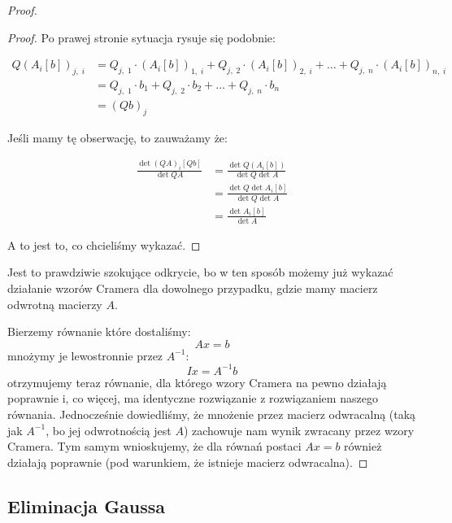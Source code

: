 \begin{proof}
\begin{proof}
		Po prawej stronie sytuacja rysuje się podobnie:

		\begin{align*}
			Q(A_i[b])_{j, \; i} & = Q_{j, \; 1} \cdot (A_i[b])_{1, \; i} + Q_{j, \; 2} \cdot (A_i[b])_{2, \; i} + \dots + Q_{j, \; n} \cdot (A_i[b])_{n, \; i} \\ &=
			Q_{j, \; 1} \cdot b_1 + Q_{j, \; 2} \cdot b_2 + \dots + Q_{j, \; n} \cdot b_n                                                                      \\
			                    & = (Qb)_{j}
		\end{align*}

		Jeśli mamy tę obserwację, to zauważamy że:

		\begin{align*}
			\frac{\det{(QA)_i[Qb]}}{\det{QA}} & = \frac{\det{Q(A_i[b])}}{\det{Q}\det{A}}      \\
			                                  & = \frac{\det{Q} \det{A_i[b]}}{\det{Q}\det{A}} \\
			                                  & = \frac{\det{A_i[b]}}{\det{A}}
		\end{align*}

		A to jest to, co chcieliśmy wykazać.
	\end{proof}

	Jest to prawdziwie szokujące odkrycie, bo w ten sposób możemy już wykazać działanie wzorów Cramera dla dowolnego przypadku, gdzie mamy macierz odwrotną macierzy \(A\).

	Bierzemy równanie które dostaliśmy:
	\[
		Ax = b
	\]
	mnożymy je lewostronnie przez \(A^{-1}\):
	\[
		Ix = A^{-1}b
	\]
	otrzymujemy teraz równanie, dla którego wzory Cramera na pewno działają poprawnie i, co więcej, ma identyczne rozwiązanie z rozwiązaniem naszego równania. Jednocześnie dowiedliśmy, że mnożenie przez macierz odwracalną (taką jak \(A^{-1}\), bo jej odwrotnością jest \(A\)) zachowuje nam wynik zwracany przez wzory Cramera. Tym samym wnioskujemy, że dla równań postaci \(Ax = b\) również działają poprawnie (pod warunkiem, że istnieje macierz odwracalna).

\end{proof}

\subsection{Eliminacja Gaussa}